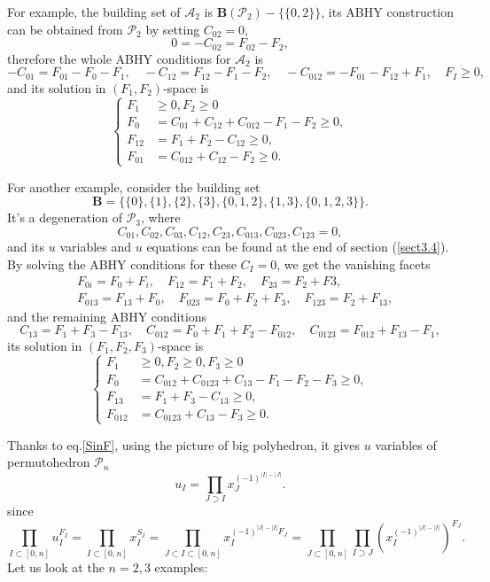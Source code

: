 \documentclass[hidelinks,12pt]{article}
\newcommand{\bea}[1]{\begin{eqnarray}\label{#1} }
\newcommand{\eea}{\end{eqnarray}}
\def\bea{\begin{eqnarray}}
\def\eea{\end{eqnarray}}
\begin{document}
For example, the building set of $\mathscr A_2$ is $\mathbf B(\mathscr P_2)-\{\{0,2\}\}$,
its ABHY construction can be obtained from $\mathscr P_2$ by setting $C_{02}=0$, 
\[
	0=-C_{02}=F_{02}-F_2,
\]
therefore the whole ABHY conditions for $\mathscr A_2$ is 
\[
	-C_{01}=F_{01}-F_0-F_1,\quad -C_{12}=F_{12}-F_1-F_2,\quad 
	-C_{012}=-F_{01}-F_{12}+F_1,\quad F_I\geq 0,
\]
and its solution in $(F_1,F_2)$-space is 
\[
	\left\{\begin{aligned}
		F_1&\geq 0,F_2\geq 0\\
		F_0&=C_{01}+C_{12}+C_{012}-F_1-F_2\geq 0,\\
		F_{12}&=F_1+F_2-C_{12}\geq 0,\\
		F_{01}&=C_{012}+C_{12}-F_2\geq 0.
	\end{aligned}\right.
\]

For another example, consider the building set
\[
\mathbf{B}=\{\{0\},\{1\},\{2\},\{3\},\{0,1,2\},\{1,3\},\{0,1,2,3\}\}.
\]
It's a degeneration of $\mathscr P_3$, where
\[
C_{01},C_{02},C_{03},C_{12},C_{23},C_{013},C_{023},C_{123}=0,
\]
and its $u$ variables and $u$ equations can be found at the end of section (\ref{sect3.4}). By solving the ABHY conditions for these $C_I=0$, we get the vanishing facets
\begin{align*}
&F_{0i}=F_0+F_i,\quad F_{12}=F_1+F_2,\quad F_{23}=F_2+F3,\\
&F_{013}=F_{13}+F_0,\quad F_{023}=F_0+F_2+F_3,\quad F_{123}=F_2+F_{13},
\end{align*}
and the remaining ABHY conditions
\[
C_{13}=F_1+F_3-F_{13},\quad C_{012}=F_{0}+F_{1}+F_2-F_{012},
\quad C_{0123}=F_{012}+F_{13}-F_1,
\]
its solution in $(F_1,F_2,F_3)$-space is 
\[
	\left\{\begin{aligned}
		F_1&\geq 0,F_2\geq 0,F_3\geq 0\\
		F_0&=C_{012}+C_{0123}+C_{13}-F_1-F_2-F_3\geq 0,\\
		F_{13}&=F_1+F_3-C_{13}\geq 0,\\
		F_{012}&=C_{0123}+C_{13}-F_3\geq 0.
	\end{aligned}\right.
\]

Thanks to eq.\eqref{SinF}, using the picture of big polyhedron, it gives $u$ variables of permutohedron $\mathscr P_n$
\begin{equation}
  u_I=\prod_{J\supset I}x_J^{(-1)^{|I|-|J|}}. \label{uvarforPn}
\end{equation}
since
\[
	\prod_{I\subset [0,n]}u_I^{F_I}=
	\prod_{I\subset [0,n]}x_I^{S_I}=
	\prod_{ J\subset I\subset [0,n]}
	x_I^{(-1)^{|J|-|I|}F_J}=
	\prod_{J\subset [0,n]}
	\prod_{I\supset J}(x_I^{(-1)^{|J|-|I|}})^{F_J}.
\]
Let us look at the $n=2,3$ examples:
\end{document}
